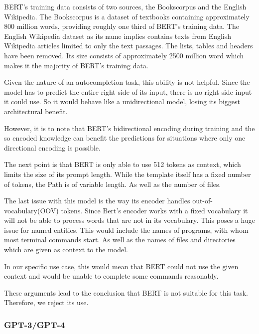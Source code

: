  
 BERT's training data consists of two sources, the Bookscorpus and the English Wikipedia. The Bookscorpus is a dataset of textbooks containing approximately 800 million words, providing roughly one third of BERT's training data. The English Wikipedia dataset as its name implies contains texts from English Wikipedia articles limited to only the text passages. The lists, tables and headers have been removed.
Its size consists of approximately 2500 million word which makes it the majority of BERT's training data. \cite{devlin2019bert}


 Given the nature of an autocompletion task, this ability is not helpful. Since the model has to predict the entire right side of its input, there is no right side input it could use. So it would behave like a unidirectional model, losing its biggest architectural benefit.
 
However, it is to note that BERT's bidirectional encoding during training and the so encoded knowledge can benefit the predictions  for situations where only one directional encoding is possible.

The next point is that BERT is only able to use 512 tokens as context, which limits the size of its prompt length. While the template itself has a fixed number of tokens, the Path is of variable length. As well as the number of files.



The last issue with this model is the way its encoder handles out-of-vocabulary(OOV) tokens. Since Bert's encoder works with a fixed vocabulary it will not be able to process words that are not in its vocabulary. This poses a huge issue for named entities. This would include the names of programs, with whom most terminal commands start. As well as the names of files and directories which are given as context to the model. 

In our specific use case, this would mean that BERT could not use the given context and would be unable to complete some commands reasonably. 



These arguments lead to the conclusion that BERT is not suitable for this task. Therefore, we reject its use.





\subsubsection{GPT-3/GPT-4}


